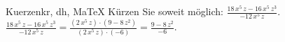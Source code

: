\begin{MAufgabe}{Kuerzen}{kr, dh, MaTeX}
K\"urzen Sie soweit m\"oglich: $\frac{18\, x^5\, z - 16\, x^5\, z^3}{- 12\, x^5\, z}$.\\ 
\ifLsg\MLoesung
\quad $\frac{18\, x^5\, z - 16\, x^5\, z^3}{- 12\, x^5\, z}=\frac{(2\, x^5\, z)\cdot(9 - 8\, z^2)}{(2\, x^5\, z)\cdot(-6)}=\frac{9 - 8\, z^2}{-6}$.\else\relax\fi
 \end{MAufgabe}